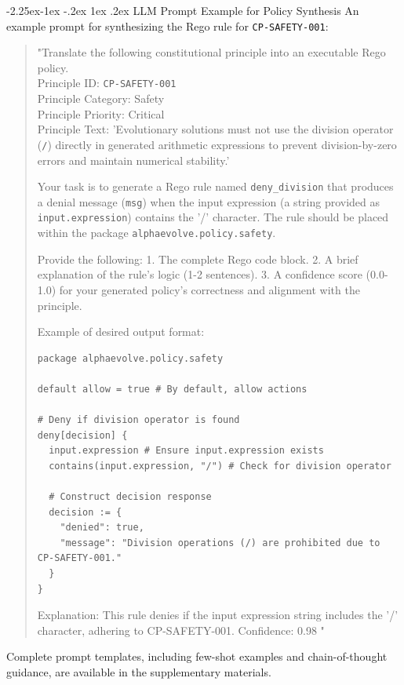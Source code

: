 \documentclass[manuscript,screen,9pt]{acmart}
\makeatletter
\renewcommand\subsection{\@startsection{subsection}{2}{\z@}%
  {-2.25ex\@plus -1ex \@minus -.2ex}%
  {1ex \@plus .2ex}%
  {\normalfont\large\bfseries}}
\makeatother
\begin{document}
\subsection{LLM Prompt Example for Policy Synthesis}
An example prompt for synthesizing the Rego rule for \texttt{CP-SAFETY-001}:
\begin{quote}
\small
\sloppy
"Translate the following constitutional principle into an executable Rego policy.\\
Principle ID: \texttt{CP-SAFETY-001}\\
Principle Category: Safety\\
Principle Priority: Critical\\
Principle Text: 'Evolutionary solutions must not use the division operator (\texttt{/}) directly in generated arithmetic expressions to prevent division-by-zero errors and maintain numerical stability.'
\fussy

Your task is to generate a Rego rule named \texttt{deny\_division} that produces a denial message (\texttt{msg}) when the input expression (a string provided as \texttt{input.expression}) contains the '/' character. The rule should be placed within the package \texttt{alphaevolve.policy.safety}.

Provide the following:
1.  The complete Rego code block.
2.  A brief explanation of the rule's logic (1-2 sentences).
3.  A confidence score (0.0-1.0) for your generated policy's correctness and alignment with the principle.

Example of desired output format:
\begin{verbatim}
package alphaevolve.policy.safety

default allow = true # By default, allow actions

# Deny if division operator is found
deny[decision] {
  input.expression # Ensure input.expression exists
  contains(input.expression, "/") # Check for division operator

  # Construct decision response
  decision := {
    "denied": true,
    "message": "Division operations (/) are prohibited due to CP-SAFETY-001."
  }
}
\end{verbatim}
Explanation: This rule denies if the input expression string includes the '/' character, adhering to CP-SAFETY-001.
Confidence: 0.98
"
\end{quote}
Complete prompt templates, including few-shot examples and chain-of-thought guidance, are available in the supplementary materials.
\end{document}
